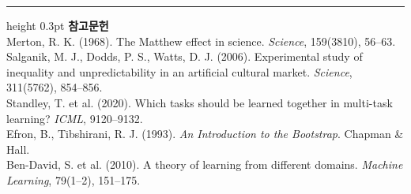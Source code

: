 \documentclass[10pt]{article}
\begin{document}
\vspace{0.6em}
\hrule height 0.3pt
\vspace{0.5em}
{\footnotesize
\textbf{참고문헌}\\[0.3em]
Merton, R. K. (1968). The Matthew effect in science. \emph{Science},
159(3810), 56--63.\\[0.15em]
Salganik, M. J., Dodds, P. S., Watts, D. J. (2006). Experimental study of
inequality and unpredictability in an artificial cultural market.
\emph{Science}, 311(5762), 854--856.\\[0.15em]
Standley, T. et al. (2020). Which tasks should be learned together in multi-task
learning? \emph{ICML}, 9120--9132.\\[0.15em]
Efron, B., Tibshirani, R. J. (1993). \emph{An Introduction to the Bootstrap}.
Chapman \& Hall.\\[0.15em]
Ben-David, S. et al. (2010). A theory of learning from different domains.
\emph{Machine Learning}, 79(1--2), 151--175.
}
\end{document}
